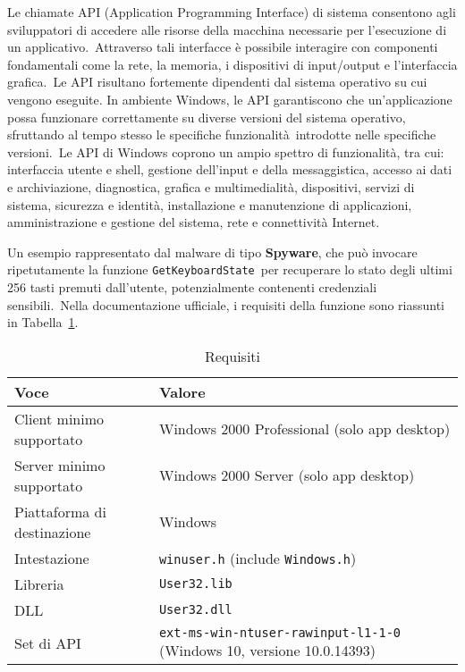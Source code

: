 
Le chiamate API (Application Programming Interface) di sistema consentono agli sviluppatori di accedere alle risorse della macchina necessarie per l'esecuzione di un applicativo.\
Attraverso tali interfacce è possibile interagire con componenti fondamentali come la rete, la memoria, i dispositivi di input/output e l'interfaccia grafica.\
Le API risultano fortemente dipendenti dal sistema operativo su cui vengono eseguite.
In ambiente Windows, le API garantiscono che un'applicazione possa funzionare correttamente su diverse versioni del sistema operativo, sfruttando al tempo stesso le specifiche funzionalità\
introdotte nelle specifiche versioni.\
Le API di Windows coprono un ampio spettro di funzionalità, tra cui: interfaccia utente e shell, gestione dell'input e della messaggistica, accesso ai dati e archiviazione,
diagnostica, grafica e multimedialità, dispositivi, servizi di sistema, sicurezza e identità, installazione e manutenzione di applicazioni, amministrazione e gestione del sistema, rete e connettività Internet.

Un esempio rappresentato dal malware di tipo \textbf{Spyware}, che può invocare ripetutamente la funzione \texttt{GetKeyboardState}\
per recuperare lo stato degli ultimi 256 tasti premuti dall'utente, potenzialmente contenenti credenziali sensibili.\
Nella documentazione ufficiale, i requisiti della funzione sono riassunti in Tabella~\ref{tab:GetKeyboardState-Requisiti}.

\begin{table}[ht]
      \centering
      \caption{Requisiti}
      \label{tab:GetKeyboardState-Requisiti}
      \begin{tabular}{ll}
            \toprule
            \textbf{Voce}               & \textbf{Valore}                                                              \\
            \midrule
            Client minimo supportato    & Windows 2000 Professional (solo app desktop)                                 \\
            Server minimo supportato    & Windows 2000 Server (solo app desktop)                                       \\
            Piattaforma di destinazione & Windows                                                                      \\
            Intestazione                & \texttt{winuser.h} (include \texttt{Windows.h})                              \\
            Libreria                    & \texttt{User32.lib}                                                          \\
            DLL                         & \texttt{User32.dll}                                                          \\
            Set di API                  & \texttt{ext-ms-win-ntuser-rawinput-l1-1-0} (Windows 10, versione 10.0.14393) \\
            \bottomrule
      \end{tabular}
\end{table}

